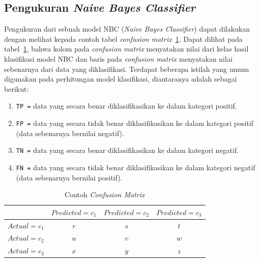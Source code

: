 \subsection{Pengukuran \textit{Naive Bayes Classifier}}
\label{subsec:Pengukuran Naive Bayes Classifier}

Pengukuran dari sebuah model NBC (\textit{Naive Bayes Classifier}) dapat dilakukan dengan melihat kepada contoh tabel \textit{confusion matrix}~\ref{tab:conf_matrix}. Dapat dilihat pada tabel~\ref{tab:conf_matrix}, bahwa kolom pada \textit{confusion matrix} menyatakan nilai dari kelas hasil klasifikasi model NBC dan baris pada \textit{confusion matrix} menyatakan nilai sebenarnya dari data yang diklasifikasi. Terdapat beberapa istilah yang umum digunakan pada perhitungan model klasifikasi, diantaranya adalah sebagai berikut:
\begin{enumerate}
	\item \texttt{TP =} data yang secara benar diklasifikasikan ke dalam kategori positif.
	\item \texttt{FP =} data yang secara tidak benar diklasifikasikan ke dalam kategori positif (data sebenarnya bernilai negatif).
	\item \texttt{TN =} data yang secara benar diklasifikasikan ke dalam kategori negatif.
	\item \texttt{FN =} data yang secara tidak benar diklasifikasikan ke dalam kategori negatif (data sebenarnya bernilai positif).
\end{enumerate}

\begin{table}[h]
\centering
\caption{Contoh \textit{Confusion Matrix}}
\label{tab:conf_matrix}
\begin{tabular}{ | c | c | c | c | }
\hline
 & $Predicted=c_1$ & $Predicted=c_2$ & $Predicted=c_3$ \\ \hline \hline
$Actual=c_1$ & $r$ & $s$ & $t$ \\ \hline
$Actual=c_2$ & $u$ & $v$ & $w$ \\ \hline
$Actual=c_3$ & $x$ & $y$ & $z$ \\ \hline
\end{tabular}
\end{table}


